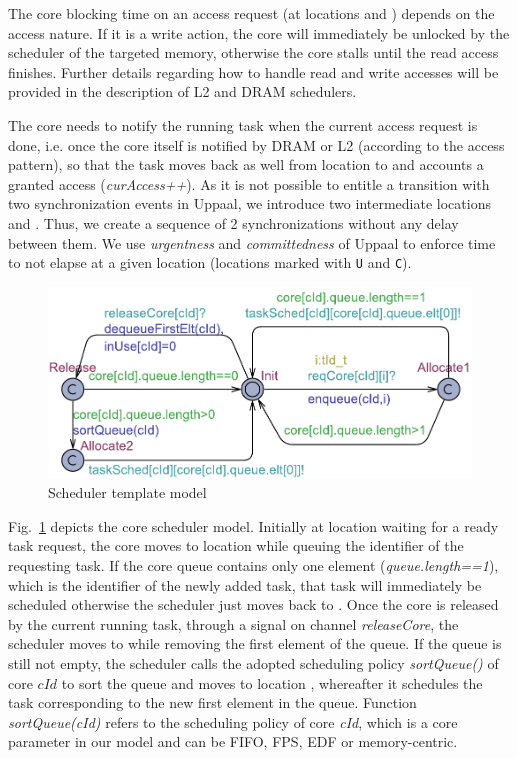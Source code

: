 The core blocking time on an access request (at locations  and ) depends on the access nature. If it is a write action, the core will immediately be unlocked by the scheduler of the targeted memory, otherwise the core stalls until the read access finishes. Further details regarding how to handle read and write accesses will be provided in the description of L2 and DRAM schedulers.    

The core needs to notify the running task when the current access request is done, i.e. once the core itself is notified by DRAM or L2 (according to the access pattern), so that the task moves back as well from location  to  and accounts a granted access (\emph{curAccess++}). As it is not possible to entitle a transition with two synchronization events in Uppaal, we introduce two intermediate locations  and . Thus, we create a sequence of 2 synchronizations without any delay between them. We use \textit{urgentness} and \textit{committedness} of Uppaal to enforce time to not elapse at a given location (locations marked with \texttt{U} and \texttt{C}).

\begin{figure}
\centering
\vspace{-2mm}
\caption{Scheduler template model}
\label{fig:sched}
\includegraphics[scale=0.46]{Scheduler.pdf}
\vspace{-7mm}
\end{figure}

 Fig.~\ref{fig:sched} depicts the core scheduler model. Initially at location  waiting for a ready task request, the core moves to location  while queuing the identifier of the requesting task. If the core queue contains only one element (\emph{queue.length==1}), which is the identifier of the newly added task, that task will immediately be scheduled otherwise the scheduler just moves back to . Once the core is released by the current running task, through a signal on channel \emph{releaseCore}, the scheduler moves to  while removing the first element of the queue. If the queue is still not empty, the scheduler calls the adopted scheduling policy \emph{sortQueue()} of core $cId$ to sort the queue and moves to location , whereafter it schedules the task corresponding to the new first element in the queue. Function \emph{sortQueue(cId)} refers to the scheduling policy of core \emph{cId}, which is a core parameter in our model and can be FIFO, FPS, EDF or memory-centric.   
   
